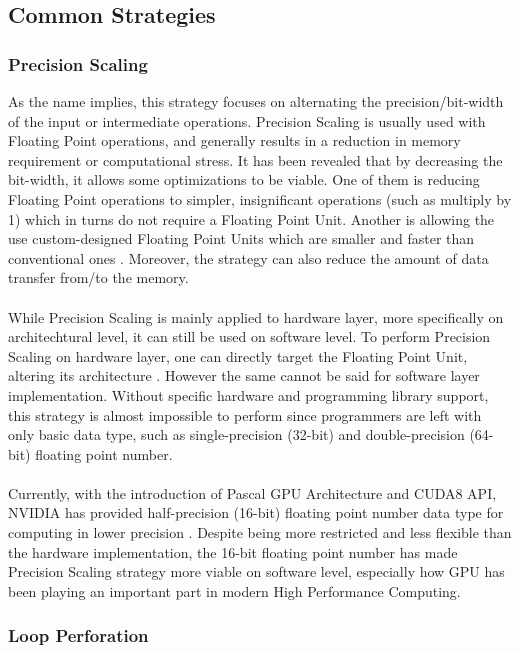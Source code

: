 \subsection{Common Strategies}

\subsubsection{Precision Scaling}

As the name implies, this strategy focuses on alternating the precision/bit-width of the input or intermediate operations. Precision Scaling is usually used with Floating Point operations, and generally results in a reduction in memory requirement or computational stress. It has been revealed that by decreasing the bit-width, it allows some optimizations to be viable. One of them is reducing Floating Point operations to simpler, insignificant operations (such as multiply by 1) which in turns do not require a Floating Point Unit. Another is allowing the use custom-designed Floating Point Units which are smaller and faster than conventional ones \cite{4408271}. Moreover, the strategy can also reduce the amount of data transfer from/to the memory. \\
~\\
While Precision Scaling is mainly applied to hardware layer, more specifically on architechtural level, it can still be used on software level. To perform Precision Scaling on hardware layer, one can directly target the Floating Point Unit, altering its architecture \cite{AxCSurvey}. However the same cannot be said for software layer implementation. Without specific hardware and programming library support, this strategy is almost impossible to perform since programmers are left with only basic data type, such as single-precision (32-bit) and double-precision (64-bit) floating point number. \\
~\\
Currently, with the introduction of Pascal GPU Architecture and CUDA8 API, NVIDIA has provided half-precision (16-bit) floating point number data type for computing in lower precision \cite{CUDA8}. Despite being more restricted and less flexible than the hardware implementation, the 16-bit floating point number has made Precision Scaling strategy more viable on software level, especially how GPU has been playing an important part in modern High Performance Computing. \\

\subsubsection{Loop Perforation}

